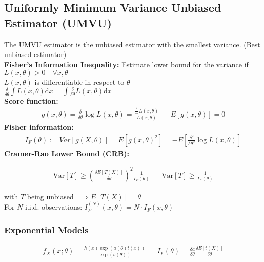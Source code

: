 \begin{mdframed}[style=eqbox]
  \subsection{Uniformly Minimum Variance Unbiased Estimator (UMVU)}
  The UMVU estimator is the unbiased estimator with the smallest variance. (Best unbiased estimator)\\[0.25em]
  \textbf{Fisher's Information Inequality:} Estimate lower bound for the variance if\\
  $ L(x, \theta) > 0 \quad \forall x, \theta$\\[0.25em]
  $ L(x, \theta)$ is differentiable in respect to $\theta$\\[0.25em]
  $ \frac{\delta}{\delta \theta} \int L(x, \theta) \text{d}x = \int \frac{\delta}{\delta \theta} L(x, \theta) \text{d}x$\\[0.5em]
  \textbf{Score function:}
  \vspace*{-4pt}
  \begin{align*}
    g(x, \theta) = \frac{\delta}{\delta \theta} \log L(x, \theta) = \frac{\frac{\delta}{\delta \theta} L(x, \theta)}{L(x, \theta)} && E[g(x, \theta)] = 0
  \end{align*}
  \textbf{Fisher information:}
  \vspace*{-4pt}
  \begin{align*}
    I_F(\theta) := Var[g(X, \theta)] = E[g(x, \theta)^2] = -E\left[\frac{\delta^2}{\delta \theta^2} \log L(x, \theta)\right]
  \end{align*}
  \textbf{Cramer-Rao Lower Bound (CRB):}
  \vspace*{-4pt}
  \begin{mdframed}[style=redbox]
    \vspace*{-10pt}
    \begin{align*}
      \text{Var}[T] \geq \left ( \frac{\delta E[T(X)]}{\delta \theta} \right )^2 \frac{1}{I_F(\theta)} && \text{Var}[T] \geq \frac{1}{I_F(\theta)}
    \end{align*}
  \end{mdframed}
  \vspace*{-4pt}\small{with $T$ being unbiased $\implies E[T(X)] = \theta$}\normalsize\\[0.25em]
  For $N$ i.i.d. observations: $I_F^{(N)}(x, \theta) = N \cdot I_F(x, \theta)$
  \subsubsection{Exponential Models}
  \vspace*{-4pt}
  \begin{align*}
    f_X(x; \theta) = \frac{h(x)\exp(a(\theta)t(x))}{\exp(b(\theta))} && I_F(\theta) = \frac{\delta a}{\delta \theta} \frac{\delta E[t(X)]}{\delta \theta}
  \end{align*}

\end{mdframed}
